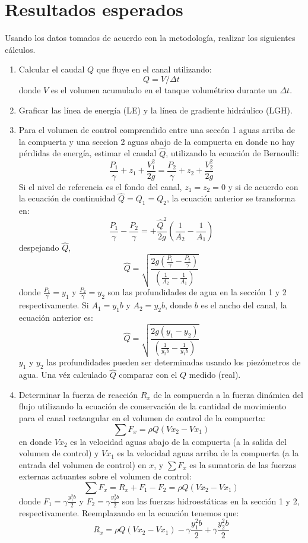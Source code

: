 \documentclass[10pt, a4paper]{exam}
\begin{document}
\section{Resultados esperados}
Usando los datos tomados de acuerdo con la metodolog\'ia, realizar los siguientes c\'alculos.
\begin{enumerate}
\item Calcular el caudal $Q$ que fluye en el canal utilizando:
$$
Q = V/\Delta t
$$
donde $V$ es el volumen acumulado en el tanque volum\'etrico durante un $\Delta t$.

\item Graficar las l\'inea de energ\'ia (LE) y la l\'inea de gradiente hidr\'aulico (LGH).

\item Para el volumen de control comprendido entre una secc\'on 1 aguas arriba de la compuerta y una seccion 2 aguas abajo de la compuerta en donde no hay p\'erdidas de energ\'ia, estimar el caudal $\hat{Q}$, utilizando la ecuaci\'on de Bernoulli:
$$
\frac{P_1}{\gamma} + z_1 + \frac{V_1^2}{2g} = \frac{P_2}{\gamma} + z_2 + \frac{V_2^2}{2g}
$$
Si el nivel de referencia es el fondo del canal, $z_1 = z_2 =0$  y si de acuerdo con la ecuaci\'on de continuidad $\hat{Q}=Q_1 = Q_2 $, la ecuaci\'on anterior se transforma en:
$$
\frac{P_1}{\gamma} - \frac{P_2}{\gamma}  = + \frac{\hat{Q}^2}{2g} \left(\frac{1}{A_2} - \frac{1}{A_1}\right)
$$
despejando $\hat{Q}$,
$$
\hat{Q} = \sqrt{\frac{2g\left(\frac{P_1}{\gamma} - \frac{P_2}{\gamma}\right)}{\left(\frac{1}{A_2} - \frac{1}{A_1}\right)}}
$$
donde $\frac{P_1}{\gamma} =y_1$ y $\frac{P_2}{\gamma} =y_2$ son las profundidades de agua en la secci\'on 1 y 2 respectivamente. Si $A_1 = y_1 b$ y $A_2 = y_2 b$, donde $b$ es el ancho del canal, la ecuaci\'on anterior es:
$$
\hat{Q} = \sqrt{\frac{2g\left(y_1 - y_2\right)}{\left(\frac{1}{y_2 b} - \frac{1}{y_1 b}\right)}}
$$
$y_1$ y $y_2$ las profundidades pueden ser determinadas usando los piez\'ometros de agua. Una v\'ez calculado $\hat{Q}$ comparar con el $Q$ medido (real).

\item Determinar la fuerza de reacci\'on $R_x$ de la compuerda a la fuerza din\'amica del flujo utilizando la ecuaci\'on de conservaci\'on de la cantidad de movimiento para el canal rectangular en el volumen de control de la compuerta:
$$
\sum F_x = \rho Q \left( Vx_2 -  Vx_1 \right)
$$
en donde $Vx_2$ es la velocidad aguas abajo de la compuerta (a la salida del volumen de control) y $Vx_1$ es la velocidad aguas arriba de la compuerta (a la entrada del volumen de control) en $x$, y $\sum F_x$ es la sumatoria de las fuerzas externas actuantes sobre el volumen de control:
$$
\sum F_x = R_x + F_1 - F_2 = \rho Q \left( Vx_2 -  Vx_1 \right)
$$
donde $F_1 = \gamma \frac{y_1^2 b}{2}$ y $F_2 = \gamma \frac{y_2^2 b}{2}$ son las fuerzas hidroest\'aticas en la secci\'on 1 y 2, respectivamente. Reemplazando en la ecuaci\'on tenemos que:
$$
R_x = \rho Q \left( Vx_2 -  Vx_1 \right) - \gamma \frac{y_1^2 b}{2} + \gamma \frac{y_2^2 b}{2}
$$


\end{enumerate}
\end{document}
